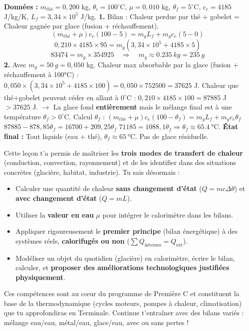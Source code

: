 \documentclass[11pt]{article}
\newcounter{popsec}
\newcounter{popsub}
\newcommand{\courssub}[1]{%
  \stepcounter{popsub}%
  \par\vspace{9pt}\noindent{\popxbold\fontsize{11.5}{13}\selectfont\color{popink}{\color{poporange}\thepopsec.\thepopsub}\hspace{6pt}#1}\par\nopagebreak\vspace{4pt}
}
\begin{document}
\begin{corrige}
\textbf{Données :} $m_{thé} = 0,200$ kg, $\theta_i = 100^\circ$C, $\mu = 0,010$ kg, $\theta_f = 5^\circ$C, $c_e = 4185$ J/kg/K, $L_f = 3,34\times10^5$ J/kg.
\textbf{1.} Bilan : Chaleur perdue par thé + gobelet = Chaleur gagnée par glace (fusion + réchauffement).
\[ (m_{thé}+\mu) c_e (100-5) = m_g L_f + m_g c_e (5-0) \]
\[ 0,210 \times 4185 \times 95 = m_g (3,34\times10^5 + 4185 \times 5) \]
\[ 83474 = m_g \times 354925 \quad \Rightarrow \quad m_g \approx \SI{0,235}{kg} = \SI{235}{g} \]
\textbf{2.} Avec $m_g = \SI{50}{g} = 0,050$ kg.
Chaleur max absorbable par la glace (fusion + réchauffement à 100°C) : $0,050 \times (3,34\times10^5 + 4185 \times 100) = 0,050 \times 752500 = 37625$ J.
Chaleur que thé+gobelet peuvent céder en allant à $0^\circ$C : $0,210 \times 4185 \times 100 = 87885$ J $> 37625$ J.
$\rightarrow$ La glace fond \textbf{entièrement} mais le mélange final est à une température $\theta_f > 0^\circ$C.
Calcul $\theta_f$ : $(m_{thé}+\mu) c_e (100-\theta_f) = m_g L_f + m_g c_e \theta_f$
$87885 - 878,85 \theta_f = 16700 + 209,25 \theta_f$
$71185 = 1088,1 \theta_f \Rightarrow \theta_f \approx \SI{65,4}{\celsius}$.
\textbf{État final :} Tout liquide (eau + thé), $\theta_f \approx \SI{65}{\celsius}$. Pas de glace résiduelle.
\end{corrige}

\courssub{Bilan de la leçon}
Cette leçon t'a permis de maîtriser les \textbf{trois modes de transfert de chaleur} (conduction, convection, rayonnement) et de les identifier dans des situations concrètes (glacière, habitat, industrie). Tu sais désormais :
\begin{itemize}
\item Calculer une quantité de chaleur \textbf{sans changement d'état} ($Q = mc\Delta\theta$) et \textbf{avec changement d'état} ($Q = mL$).
\item Utiliser la \textbf{valeur en eau} $\mu$ pour intégrer le calorimètre dans les bilans.
\item Appliquer rigoureusement le \textbf{premier principe} (bilan énergétique) à des systèmes réels, \textbf{calorifugés ou non} ($\sum Q_{\text{internes}} = Q_{\text{ext}}$).
\item Modéliser un objet du quotidien (glacière) en calorimètre, écrire le bilan, calculer, et \textbf{proposer des améliorations technologiques justifiées physiquement}.
\end{itemize}
Ces compétences sont au cœur du programme de Première C et constituent la base de la thermodynamique (cycles moteurs, pompes à chaleur, climatisation) que tu approfondiras en Terminale. Continue t'entraîner avec des bilans variés : mélange eau/eau, métal/eau, glace/eau, avec ou sans pertes !
\end{document}
